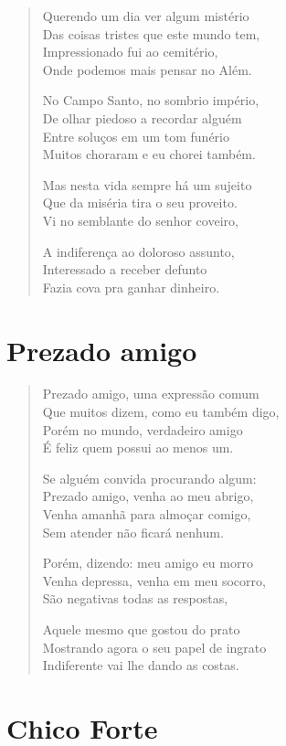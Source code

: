 \begin{verse}
Querendo um dia ver algum mistério\\
Das coisas tristes que este mundo tem,\\
Impressionado fui ao cemitério,\\
Onde podemos mais pensar no Além.

No Campo Santo, no sombrio império,\\
De olhar piedoso a recordar alguém\\
Entre soluços em um tom funério\\
Muitos choraram e eu chorei também.

Mas nesta vida sempre há um sujeito\\
Que da miséria tira o seu proveito.\\
Vi no semblante do senhor coveiro,

A indiferença ao doloroso assunto,\\
Interessado a receber defunto\\
Fazia cova pra ganhar dinheiro.
\end{verse}

\chapter{Prezado amigo}

\begin{verse}
Prezado amigo, uma expressão comum\\
Que muitos dizem, como eu também digo,\\
Porém no mundo, verdadeiro amigo\\
É feliz quem possui ao menos um.

Se alguém convida procurando algum:\\
Prezado amigo, venha ao meu abrigo,\\
Venha amanhã para almoçar comigo,\\
Sem atender não ficará nenhum.

Porém, dizendo: meu amigo eu morro\\
Venha depressa, venha em meu socorro,\\
São negativas todas as respostas,

Aquele mesmo que gostou do prato\\
Mostrando agora o seu papel de ingrato\\
Indiferente vai lhe dando as costas.
\end{verse}

\chapter{Chico Forte}

